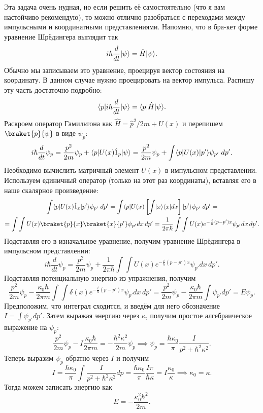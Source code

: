 Эта задача очень нудная, но если решить её самостоятельно (что я вам настойчиво
рекомендую), то можно отлично разобраться с переходами между импульсными и
координатными представлениями. Напомню, что в бра-кет форме уравнение
Шрёдингера выглядит так
\[
  i\hbar \frac{d}{dt} \lvert\psi\rangle = \hat H \lvert\psi\rangle.
\]
Обычно мы записываем это уравнение, проецируя вектор состояния на координату. В
данном случае нужно проецировать на вектор импульса. Распишу эту часть
достаточно подробно:
\[
  \langle p\rvert i\hbar \frac{d}{dt} \lvert\psi\rangle = \langle p\rvert \hat H \lvert\psi\rangle.
\]
Раскроем оператор Гамильтона как $\hat H = \hat p^2 / 2m + U(x)$ и перепишем
$\braket{p}{\psi}$ в виде $\psi_p$:
\[
  i\hbar \frac{d}{dt} \psi_p = \frac{p^2}{2m}\psi_p + \langle p\rvert U(x)\hat{1}_p\lvert\psi\rangle = \frac{p^2}{2m}\psi_p + \int\langle p\rvert U(x)\lvert p'\rangle\psi_{p'}\;dp'.
\]
Необходимо вычислить матричный элемент $U(x)$ в импульсном представлении.
Используем единичный оператор (только на этот раз координаты), вставляя его в
наше скалярное произведение:
\begin{gather*}
  \int\bra{p}U(x)\hat{1}_x\ket{p'}\psi_{p'}\;dp' = \int \bra{p}U(x)\left[\int\ket{x}\bra{x}dx\right]\ket{p'} \psi_{p'}\;dp'= \\
  = \int\int U(x)\braket{p}{x}\braket{x}{p'} \psi_{p'} dx\,dp' = \frac{1}{2\pi\hbar}\int\int U(x) e^{-\frac{i}{\hbar}(p-p')x}\psi_{p'} dx\,dp'.
\end{gather*}
Подставляя его в изначальное уравнение, получим уравнение Шрёдингера в
импульсном представлении:
\[
  i\hbar \frac{d}{dt} \psi_p =\frac{p^2}{2m}\psi_p + \frac{1}{2\pi\hbar}\int\int U(x) e^{-\frac{i}{\hbar}(p-p')x}\psi_{p'} dx\,dp'.
\]
Подставляя потенциальную энергию из упражнения, получим
\[
  \frac{p^2}{2m}\psi_p - \frac{\kappa_0\hbar}{2\pi m}\int\int \delta(x) e^{-\frac{i}{\hbar}(p-p')x}\psi_{p'} dx\,dp'= \frac{p^2}{2m}\psi_p - \frac{\kappa_0\hbar}{2\pi m}\int\psi_{p'} dp' =  E\psi_p.
\]
Предположим, что интеграл сходится, и введём для него обозначение $I = \int
  \psi_{p'}dp'$. Затем выражая энергию через $\kappa$, получим простое
алгебраическое выражение на $\psi_p$:
\[
  \frac{p^2}{2m}\psi_p - I\frac{\kappa_0\hbar}{2\pi m} = -\frac{\hbar^2\kappa^2}{2m}\psi_p \implies \psi_p = \frac{\hbar\kappa_0}{\pi}\frac{I}{p^2 + \hbar^2\kappa^2}.
\]
Теперь выразим $\psi_p$ обратно через $I$ и получим
\[
  I = \frac{\hbar\kappa_0}{\pi}\int\frac{I}{p^2 + \hbar^2\kappa^2}dp = \frac{\hbar \kappa_0}{\pi}\frac{I \pi}{\hbar\kappa} = I\frac{\kappa_0}{\kappa} \implies \kappa_0 = \kappa.
\]
Тогда можем записать энергию как
\[
  E = -\frac{\kappa^2_0\hbar^2}{2m}.
\]

